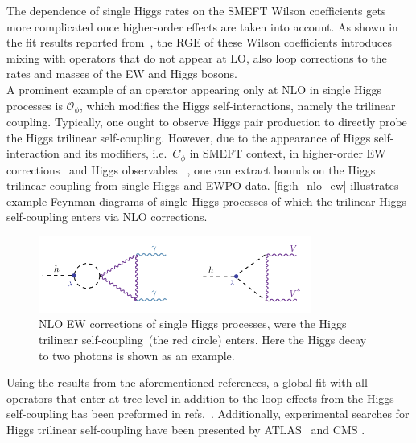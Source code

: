 The dependence of single Higgs rates on the SMEFT Wilson coefficients gets more complicated once higher-order effects are taken into account. As shown in the fit results reported from~\cite{Dawson:2020oco}, the RGE of these Wilson coefficients introduces mixing with operators that do not appear at LO, also loop corrections to the rates and masses of the EW and Higgs bosons. \\A prominent example of an operator appearing only at NLO in single Higgs processes is $\mathcal O_\phi$, which modifies the Higgs self-interactions, namely the trilinear coupling. 
Typically, one ought to observe Higgs pair production to directly probe the Higgs trilinear self-coupling. However, due to the appearance of Higgs self-interaction and its modifiers, i.e.~$C_\phi$ in SMEFT context, in higher-order EW corrections~\cite{Degrassi:2014sxa,Kribs:2017znd} and Higgs observables~ \cite{McCullough:2013rea, Gorbahn:2016uoy, Degrassi:2016wml, Bizon:2016wgr, Maltoni:2017ims, Degrassi:2019yix, Degrassi:2021uik, Haisch:2021hvy}, one can extract bounds on the Higgs trilinear coupling from single Higgs and EWPO data. \autoref{fig:h_nlo_ew} illustrates example Feynman diagrams of single Higgs processes of which the trilinear Higgs self-coupling enters via NLO corrections.
\begin{figure}[htpb!]
	\begin{center}
		\includegraphics[width=0.8\textwidth]{figures/htoaa_nlo_ew}
		\caption{NLO EW corrections of single Higgs processes,  were the Higgs trilinear self-coupling~(the red circle) enters. Here the Higgs decay to two photons is shown as an example. \label{fig:h_nlo_ew} }
	\end{center}
\end{figure}
Using the results from the aforementioned references, a global fit with all operators that enter at tree-level in addition to the loop effects from the Higgs self-coupling has been preformed in refs.~\cite{DiVita:2017eyz,Dawson:2020oco}. Additionally, experimental searches for Higgs trilinear self-coupling have been presented by ATLAS~\cite{ATLAS:2019pbo} and CMS \cite{CMS:2020gsy}. 
